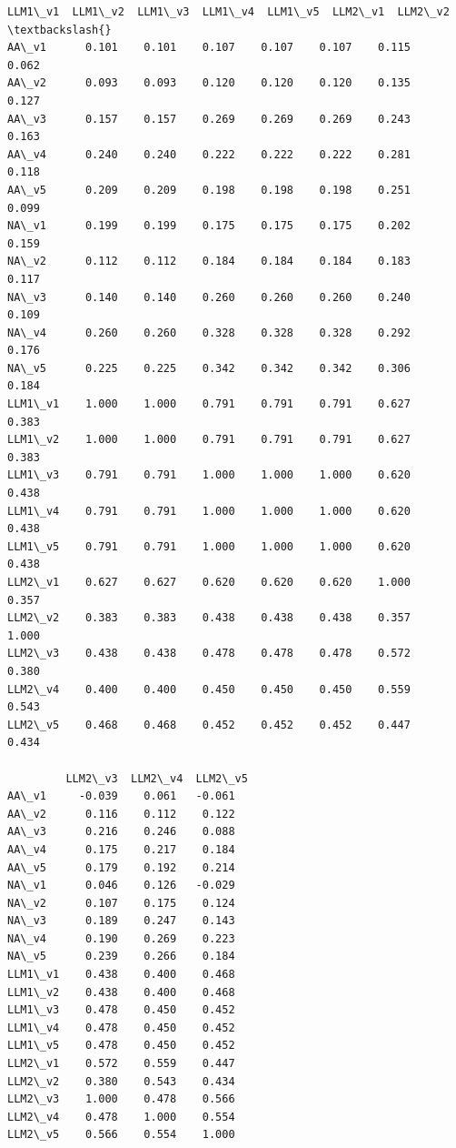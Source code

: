 \documentclass[11pt]{article}
\begin{document}
\begin{tcolorbox}[breakable, size=fbox, boxrule=.5pt, pad at break*=1mm, opacityfill=0]
\begin{Verbatim}[commandchars=\\\{\}]
         LLM1\_v1  LLM1\_v2  LLM1\_v3  LLM1\_v4  LLM1\_v5  LLM2\_v1  LLM2\_v2  \textbackslash{}
AA\_v1      0.101    0.101    0.107    0.107    0.107    0.115    0.062
AA\_v2      0.093    0.093    0.120    0.120    0.120    0.135    0.127
AA\_v3      0.157    0.157    0.269    0.269    0.269    0.243    0.163
AA\_v4      0.240    0.240    0.222    0.222    0.222    0.281    0.118
AA\_v5      0.209    0.209    0.198    0.198    0.198    0.251    0.099
NA\_v1      0.199    0.199    0.175    0.175    0.175    0.202    0.159
NA\_v2      0.112    0.112    0.184    0.184    0.184    0.183    0.117
NA\_v3      0.140    0.140    0.260    0.260    0.260    0.240    0.109
NA\_v4      0.260    0.260    0.328    0.328    0.328    0.292    0.176
NA\_v5      0.225    0.225    0.342    0.342    0.342    0.306    0.184
LLM1\_v1    1.000    1.000    0.791    0.791    0.791    0.627    0.383
LLM1\_v2    1.000    1.000    0.791    0.791    0.791    0.627    0.383
LLM1\_v3    0.791    0.791    1.000    1.000    1.000    0.620    0.438
LLM1\_v4    0.791    0.791    1.000    1.000    1.000    0.620    0.438
LLM1\_v5    0.791    0.791    1.000    1.000    1.000    0.620    0.438
LLM2\_v1    0.627    0.627    0.620    0.620    0.620    1.000    0.357
LLM2\_v2    0.383    0.383    0.438    0.438    0.438    0.357    1.000
LLM2\_v3    0.438    0.438    0.478    0.478    0.478    0.572    0.380
LLM2\_v4    0.400    0.400    0.450    0.450    0.450    0.559    0.543
LLM2\_v5    0.468    0.468    0.452    0.452    0.452    0.447    0.434

         LLM2\_v3  LLM2\_v4  LLM2\_v5
AA\_v1     -0.039    0.061   -0.061
AA\_v2      0.116    0.112    0.122
AA\_v3      0.216    0.246    0.088
AA\_v4      0.175    0.217    0.184
AA\_v5      0.179    0.192    0.214
NA\_v1      0.046    0.126   -0.029
NA\_v2      0.107    0.175    0.124
NA\_v3      0.189    0.247    0.143
NA\_v4      0.190    0.269    0.223
NA\_v5      0.239    0.266    0.184
LLM1\_v1    0.438    0.400    0.468
LLM1\_v2    0.438    0.400    0.468
LLM1\_v3    0.478    0.450    0.452
LLM1\_v4    0.478    0.450    0.452
LLM1\_v5    0.478    0.450    0.452
LLM2\_v1    0.572    0.559    0.447
LLM2\_v2    0.380    0.543    0.434
LLM2\_v3    1.000    0.478    0.566
LLM2\_v4    0.478    1.000    0.554
LLM2\_v5    0.566    0.554    1.000
\end{Verbatim}
\end{tcolorbox}
        
    \begin{center}
    \end{center}
    { \hspace*{\fill} \\}
    
\end{document}
